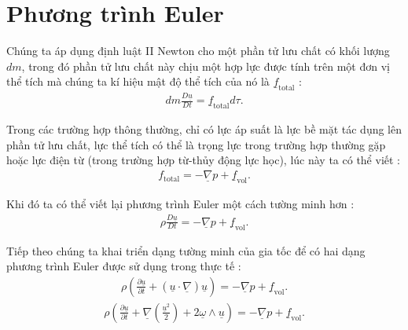 \documentclass[CO_LUU_CHAT.tex]{subfiles}
\begin{document}
\section{Phương trình Euler}

	Chúng ta áp dụng định luật II Newton cho một phần tử lưu chất có khối lượng $dm$, trong đó phần tử lưu chất này chịu một hợp lực được tính trên một đơn vị thể tích mà chúng ta kí hiệu mật độ thể tích của nó là $\underline{f}_{\text{total}}$ :
		\begin{equation}
			\begin{aligned}
				dm\frac{D\underline{u}}{Dt}=\underline{f}_{\text{total}}d\tau.
			\end{aligned}
		\end{equation}

Trong các trường hợp thông thường, chỉ có lực áp suất là lực bề mặt tác dụng lên phần tử lưu chất, lực thể tích có thể là trọng lực trong trường hợp thường gặp hoặc lực điện từ (trong trường hợp từ-thủy động lực học), lúc này ta có thể viết :
\begin{equation}
	\begin{aligned}
		f_{\text{total}}=-\underline{\nabla}p+\underline{f}_{\text{vol}}.
	\end{aligned}
\end{equation}

Khi đó ta có thể viết lại phương trình Euler một cách tường minh hơn :
\begin{equation}
	\begin{aligned}
		\rho\frac{D\underline{u}}{Dt}=-\underline{\nabla}p+\underline{f}_{\text{vol}}.
	\end{aligned}
\end{equation}

Tiếp theo chúng ta khai triển dạng tường minh của gia tốc để có hai dạng phương trình Euler được sử dụng trong thực tế :
\begin{equation}\label{eq:euler_convection}
	\begin{aligned}
		\boxed{
		\rho\left(\frac{\partial\underline{u}}{\partial t}+\left(\underline{u}\cdot\underline{\nabla}\right)\underline{u}\right)=-\underline{\nabla}p+\underline{f}_{\text{vol}}}.
	\end{aligned}
\end{equation}
\begin{equation}\label{eq:euler_rotation}
	\begin{aligned}
		\boxed{
		\rho\left(\frac{\partial\underline{u}}{\partial t}+\underline{\nabla}\left(\frac{\underline{u}^2}{2}\right)+2\underline{\omega}\wedge\underline{u}\right)=-\underline{\nabla}p+\underline{f}_{\text{vol}}}.
	\end{aligned}
\end{equation}
\end{document}
